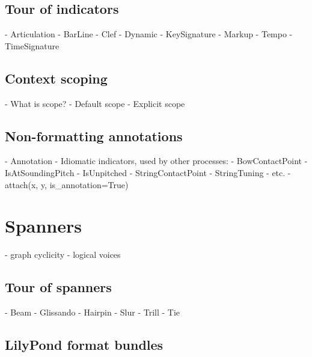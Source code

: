 \subsection{Tour of indicators}

\begin{markdown}
-   Articulation
-   BarLine
-   Clef
-   Dynamic
-   KeySignature
-   Markup
-   Tempo
-   TimeSignature
\end{markdown}

\subsection{Context scoping}

\begin{markdown}
-   What is scope?
-   Default scope
-   Explicit scope
\end{markdown}

\subsection{Non-formatting annotations}

\begin{markdown}
-   Annotation
-   Idiomatic indicators, used by other processes:
    -   BowContactPoint
    -   IsAtSoundingPitch
    -   IsUnpitched
    -   StringContactPoint
    -   StringTuning
    -   etc.
-   attach(x, y, is_annotation=True)
\end{markdown}

\section{Spanners}

\begin{markdown}
-   graph cyclicity
-   logical voices
\end{markdown}

\subsection{Tour of spanners}

\begin{markdown}
-   Beam
-   Glissando
-   Hairpin
-   Slur
-   Trill
-   Tie
\end{markdown}

\subsection{LilyPond format bundles}

